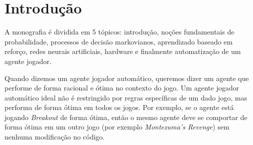 \documentclass[a4paper,10pt]{article}
\theoremstyle{plain}
\begin{document}
\section{Introdução}

A monografia é dividida em 5 tópicos: introdução, noções fundamentais de probabilidade, processos
de decisão markovianos, aprendizado baseado em reforço, redes neurais artificiais, hardware e
finalmente automatização de um agente jogador.

Quando dizemos um agente jogador automático, queremos dizer um agente que performe de forma
racional e ótima no contexto do jogo. Um agente jogador automático ideal não é restringido por
regras específicas de um dado jogo, mas performa de forma ótima em todos os jogos. Por exemplo,
se o agente está jogando \textit{Breakout} de forma ótima, então o mesmo agente deve se comportar
de forma ótima em um outro jogo (por exemplo \textit{Montezuma's Revenge}) sem nenhuma
modificação no código.

\begin{figure}[h]
\end{figure}
\end{document}

